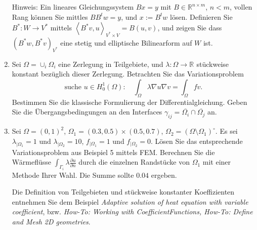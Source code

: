 \documentclass[11pt,a4paper]{report}
\newcommand{\R}[1]{\mathbb{R}^{#1}}
\begin{document}
\begin{enumerate}
Hinweis: Ein lineares Gleichungssystem $B x = y$ mit $B \in \R{n
  \times m}$, $n < m$, vollen Rang k\"onnen Sie mittles 
$B B^t w = y$, und $x := B^t w$ l\"osen. Definieren Sie $B^\ast : W
\rightarrow V^\ast$ mittels $\left<B^\ast v, u\right>_{V^\ast \times V} =
B(u,v)$, und zeigen Sie dass $(B^\ast w, B^\ast v)_{V^\ast}$ eine stetig und
elliptische Bilinearform auf $W$ ist.


\item Sei $\Omega = \cup_i \Omega_i$ eine Zerlegung in Teilgebiete, und
  $\lambda : \Omega \rightarrow \R{}$ st\"uckweise konstant bez\"uglich dieser
  Zerlegung. Betrachten Sie das Variationsproblem
$$
\text{suche } u \in H_0^1(\Omega): \quad
\int_\Omega \lambda \nabla u \nabla v = \int_\Omega f v.
$$
Bestimmen Sie die klassische Formulierung der
Differentialgleichung. Geben Sie die \"Ubergangsbedingungen an den
Interfaces $\gamma_{ij} = \overline{\Omega_i} \cap
\overline{\Omega_j}$ an.


\item Sei $\Omega = (0,1)^2$,  $\Omega_1 = (0.3,0.5) \times
  (0.5,0.7)$, $\Omega_2 = (\Omega \setminus \Omega_1)^\circ$.  
Es sei $\lambda_{|\Omega_1} = 1$ und $\lambda_{|\Omega_2} = 10$,
 $f_{|\Omega_1} = 1$ und $f_{|\Omega_2} = 0$. L\"osen Sie das
 entsprechende
Variationsproblem aus Beispiel 5 mittels FEM.
Berechnen Sie die W\"armefl\"usse $\int_{\Gamma_i} \lambda
 \frac{\partial u}{\partial n}$ durch die einzelnen  Randst\"ucke von
 $\Omega_1$ mit einer Methode Ihrer Wahl. Die Summe sollte $0.04$ ergeben.

Die Definition von Teilgebieten und st\"uckweise konstanter
Koeffizienten entnehmen Sie dem Beispiel {\it Adaptive solution of
  heat equation with variable coefficient}, bzw. {\it How-To: Working
  with CoefficientFunctions, How-To: Define and Mesh 2D geometries}.

\end{enumerate}
\end{document}
